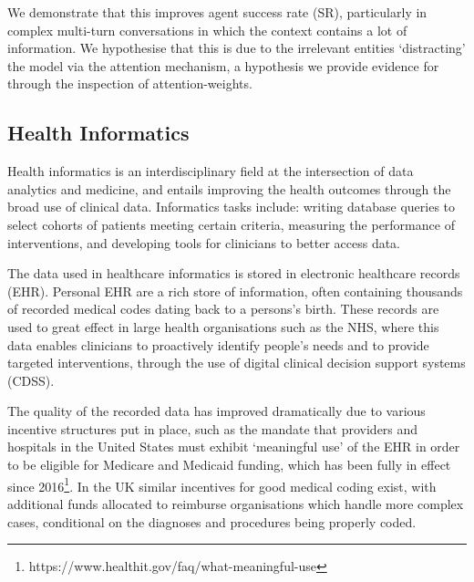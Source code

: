 \documentclass[11pt]{article}
\begin{document}
We demonstrate that this improves agent success rate (SR), particularly in complex multi-turn conversations in which the context contains a lot of information.
We hypothesise that this is due to the irrelevant entities `distracting' the model via the attention mechanism, a hypothesis we provide evidence for through the inspection of attention-weights. %



\subsection{Health Informatics}
Health informatics is an interdisciplinary field at the intersection of data analytics and medicine, and entails improving the health outcomes through the broad use of clinical data. Informatics tasks include: writing database queries to select cohorts of patients meeting certain criteria, measuring the performance of interventions, and developing tools for clinicians to better access data. 

The data used in healthcare informatics is stored in electronic healthcare records (EHR). Personal EHR are a rich store of information, often containing thousands of recorded medical codes dating back to a persons's birth. These records are used to great effect in large health organisations such as the NHS, where this data enables clinicians to proactively identify people's needs and to provide targeted interventions, through the use of digital clinical decision support systems (CDSS).


The quality of the recorded data has improved dramatically due to various incentive structures put in place, such as the mandate that providers and hospitals in the United States must exhibit `meaningful use' of the EHR in order to be eligible for Medicare and Medicaid funding, which has been fully in effect since 2016\footnote{https://www.healthit.gov/faq/what-meaningful-use}. In the UK similar incentives for good medical coding exist, with additional funds allocated to reimburse organisations which handle more complex cases, conditional on the diagnoses and procedures being properly coded.
\end{document}
